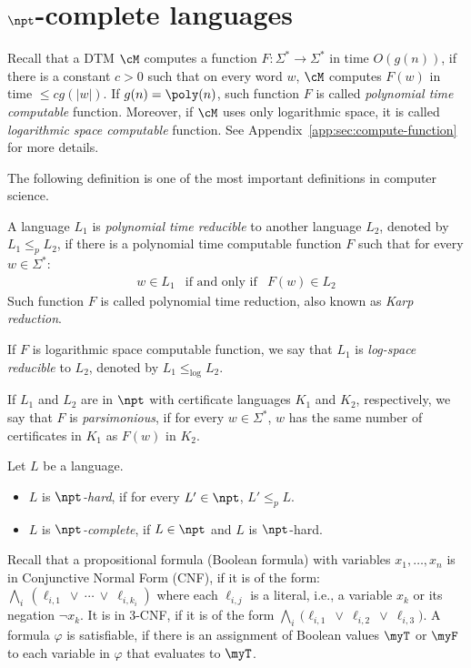 \documentclass[11pt, a4paper]{article}
\begin{document}
\section{$\npt$-complete languages}



Recall that a DTM $\cM$ computes a function $F:\Sigma^*\to\Sigma^*$ in time $O(g(n))$, if
there is a constant $c> 0$ such that
on every word $w$, $\cM$ computes $F(w)$ in time $\leq cg(|w|)$.
If $g(n)=\poly(n)$,
such function $F$ is called {\em polynomial time computable} function.
Moreover, if $\cM$ uses only logarithmic space,
it is called {\em logarithmic space computable} function.
See Appendix~\ref{app:sec:compute-function} for more details.

The following definition is one of the most important definitions in computer science.


\begin{definition}
\label{def:reduction}
A language $L_1$ is {\em polynomial time  reducible} to another language $L_2$,
denoted by $L_1\leq_p L_2$,
if there is a polynomial time computable function $F$ such that
for every $w\in \Sigma^{*}$:
\begin{eqnarray*}
w\in L_1 & \text{if and only if} & F(w) \in L_2
\end{eqnarray*}
Such function $F$ is called polynomial time reduction, also known as {\em Karp reduction}.

If $F$ is logarithmic space computable function,
we say that $L_1$ is {\em log-space reducible} to $L_2$,
denoted by $L_1\leq_{\log} L_2$.

If $L_1$ and $L_2$ are in $\npt$ with certificate languages $K_1$ and $K_2$, respectively,
we say that $F$ is {\em parsimonious}, if for every $w\in \Sigma^{\ast}$,
$w$ has the same number of certificates in $K_1$ as $F(w)$ in $K_2$.
\end{definition}




\begin{definition}
\label{def:np-complete}
Let $L$ be a language.
\begin{itemize}\itemsep=0pt
\item 
$L$ is {\em $\npt$-hard}, if
for every $L' \in \npt$, $L' \leq_p L$.
\item
$L$ is {\em $\npt$-complete},
if $L \in \npt$ and $L$ is $\npt$-hard.
\end{itemize}
\end{definition}


Recall that a propositional formula (Boolean formula) with variables $x_1,\ldots,x_n$
is in Conjunctive Normal Form (CNF), if
it is of the form:
$\bigwedge_{i}\  (\ell_{i,1}\ \vee \ \cdots \ \vee \ \ell_{i,k_i})$
where each $\ell_{i,j}$ is a literal, i.e., a variable $x_k$ or its negation $\neg x_k$.
It is in 3-CNF,
if it is of the form
$\bigwedge_{i}\ \big(\ell_{i,1} \ \vee \ \ell_{i,2} \ \vee \ \ell_{i,3}\big)$.
A formula $\varphi$ is satisfiable, if there is an assignment of Boolean values $\myT$ or $\myF$
to each variable in $\varphi$ that evaluates to $\myT$.
\end{document}
